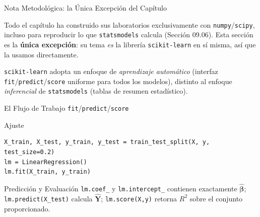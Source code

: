 \documentclass[10pt, aspectratio=169]{beamer}
\begin{document}
\begin{frame}{Nota Metodológica: la Única Excepción del Capítulo}
  \footnotesize
  \begin{motivacion}
    Todo el capítulo ha construido sus laboratorios exclusivamente con \texttt{numpy}/\texttt{scipy}, incluso para reproducir lo que \texttt{statsmodels} calcula (Sección 09.06). Esta sección es la \textbf{única excepción}: su tema \emph{es} la librería \texttt{scikit-learn} en sí misma, así que la usamos directamente.
  \end{motivacion}

  \vspace{0.15cm}
  \pause
  \texttt{scikit-learn} adopta un enfoque de \emph{aprendizaje automático} (interfaz \texttt{fit}/\texttt{predict}/\texttt{score} uniforme para todos los modelos), distinto al enfoque \emph{inferencial} de \texttt{statsmodels} (tablas de resumen estadístico).
\end{frame}

\begin{frame}[fragile]{El Flujo de Trabajo \texttt{fit}/\texttt{predict}/\texttt{score}}
  \footnotesize
  \begin{block}{Ajuste}
    \begin{verbatim}
X_train, X_test, y_train, y_test = train_test_split(X, y, test_size=0.2)
lm = LinearRegression()
lm.fit(X_train, y_train)
    \end{verbatim}
  \end{block}
  \pause

  \vspace{0.1cm}
  \begin{alertblock}{Predicción y Evaluación}
    \texttt{lm.coef\_} y \texttt{lm.intercept\_} contienen exactamente $\hat{\boldsymbol\beta}$; \texttt{lm.predict(X\_test)} calcula $\hat{\mathbf{Y}}$; \texttt{lm.score(X,y)} retorna $R^2$ sobre el conjunto proporcionado.
  \end{alertblock}
\end{frame}
\end{document}
